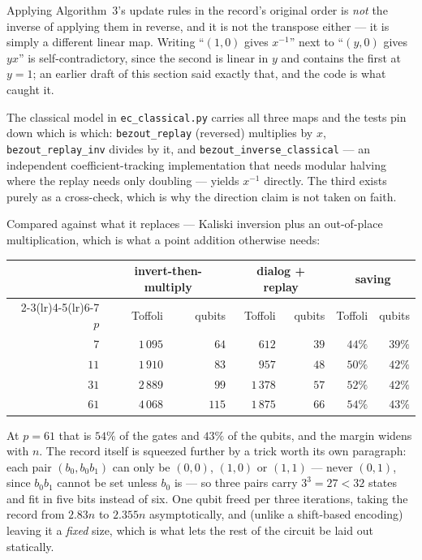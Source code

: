 \documentclass[11pt]{article}
\newcommand{\code}[1]{\texttt{#1}}
\theoremstyle{plain}
\theoremstyle{remark}
\begin{document}
\begin{keybox}[title={Direction matters, and it is easy to get wrong}]
Applying Algorithm~3's update rules in the record's original order is \emph{not} the inverse of
applying them in reverse, and it is not the transpose either --- it is simply a different linear
map. Writing ``$(1,0)$ gives $x^{-1}$'' next to ``$(y,0)$ gives $yx$'' is self-contradictory, since
the second is linear in $y$ and contains the first at $y=1$; an earlier draft of this section said
exactly that, and the code is what caught it.

The classical model in \code{ec\_classical.py} carries all three maps and the tests pin down which
is which: \code{bezout\_replay} (reversed) multiplies by $x$, \code{bezout\_replay\_inv} divides by
it, and \code{bezout\_inverse\_classical} --- an independent coefficient-tracking implementation
that needs modular halving where the replay needs only doubling --- yields $x^{-1}$ directly. The
third exists purely as a cross-check, which is why the direction claim is not taken on faith.
\end{keybox}

\noindent
Compared against what it replaces --- Kaliski inversion plus an out-of-place multiplication, which
is what a point addition otherwise needs:

\begin{center}\small
\begin{tabular}{@{}rrrrrrr@{}}
\toprule
& \multicolumn{2}{c}{invert-then-multiply} & \multicolumn{2}{c}{dialog + replay} & \multicolumn{2}{c}{saving}\\
\cmidrule(lr){2-3}\cmidrule(lr){4-5}\cmidrule(lr){6-7}
$p$ & Toffoli & qubits & Toffoli & qubits & Toffoli & qubits\\
\midrule
$7$ & $1\,095$ & $64$ & $612$ & $39$ & $44\%$ & $39\%$\\
$11$ & $1\,910$ & $83$ & $957$ & $48$ & $50\%$ & $42\%$\\
$31$ & $2\,889$ & $99$ & $1\,378$ & $57$ & $52\%$ & $42\%$\\
$61$ & $4\,068$ & $115$ & $1\,875$ & $66$ & $54\%$ & $43\%$\\
\bottomrule
\end{tabular}
\end{center}

\noindent
At $p=61$ that is $54\%$ of the gates and $43\%$ of the qubits, and the
margin widens with $n$. The record itself is
squeezed further by a trick worth its own paragraph: each pair $(b_0, b_0b_1)$ can only be
$(0,0)$, $(1,0)$ or $(1,1)$ --- never $(0,1)$, since $b_0b_1$ cannot be set unless $b_0$ is --- so
three pairs carry $3^3=27<32$ states and fit in five bits instead of six. One qubit freed per three
iterations, taking the record from $2.83n$ to $2.355n$ asymptotically, and (unlike a shift-based
encoding) leaving it a \emph{fixed} size, which is what lets the rest of the circuit be laid out
statically.
\end{document}
